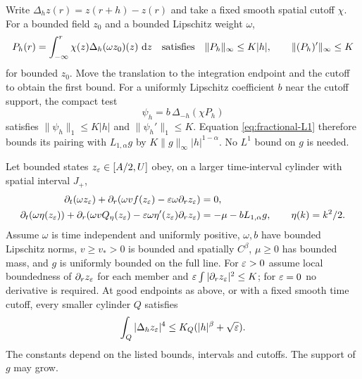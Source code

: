 Write $\Delta_hz(r)=z(r+h)-z(r)$ and take a fixed smooth spatial cutoff
$\chi$. For a bounded field $z_0$ and a bounded Lipschitz weight $\omega$,
\[
 P_h(r)=\int_{-\infty}^r\chi(z)\Delta_h(\omega z_0)(z)\,\,\mathrm d z
 \quad\hbox{satisfies}\quad
 \|P_h\|_\infty\leq K|h|,\qquad \|(P_h)'\|_\infty\leq K
\]
for bounded $z_0$. Move the translation to the integration endpoint and
the cutoff to obtain the first bound. For a uniformly Lipschitz coefficient
$b$ near the cutoff support, the compact test
\begin{equation}\label{eq:correct-test}
 \psi_h=b\,\Delta_{-h}(\chi P_h)
\end{equation}
satisfies $\|\psi_h\|_1\leq K|h|$ and
$\|\psi_h'\|_1\leq K$. Equation \eqref{eq:fractional-L1} therefore
bounds its pairing with $L_{1,\alpha}g$ by
$K\|g\|_\infty|h|^{1-\alpha}$. No $L^1$ bound on $g$ is needed.

\begin{lemma}\label{lem:increments}
Let bounded states $z_\varepsilon\in[A/2,U]$ obey, on a larger time-interval
cylinder with spatial interval $J_+$,
\begin{align*}
 \partial_t(\omega z_\varepsilon)+
 \partial_r(\omega vf(z_\varepsilon)-\varepsilon\omega\partial_rz_\varepsilon)&=0,\\
 \partial_t(\omega\eta(z_\varepsilon))+
 \partial_r(\omega vQ_\eta(z_\varepsilon)-\varepsilon\omega\eta'(z_\varepsilon)\partial_rz_\varepsilon)
 &=-\mu-bL_{1,\alpha}g,
 \qquad\eta(k)=k^2/2.
\end{align*}
Assume $\omega$ is time independent and uniformly positive, $\omega,b$
have bounded Lipschitz norms, $v\geq v_*>0$ is bounded and spatially
$C^\beta$, $\mu\geq0$ has bounded mass, and $g$ is uniformly bounded
on the full line. For $\varepsilon>0$ assume local boundedness of
$\partial_rz_\varepsilon$ for each member and
$\varepsilon\int|\partial_rz_\varepsilon|^2\leq K$; for $\varepsilon=0$ no derivative is
required. At good endpoints as above, or with a fixed smooth time cutoff,
every smaller cylinder $Q$ satisfies
\begin{equation}\label{eq:L4-increment}
 \int_Q|\Delta_hz_\varepsilon|^4\leq K_Q(|h|^\beta+\sqrt{\varepsilon}).
\end{equation}
The constants depend on the listed bounds, intervals and cutoffs. The
support of $g$ may grow.
\end{lemma}

